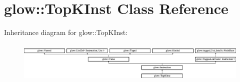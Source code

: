 \hypertarget{classglow_1_1_top_k_inst}{}\section{glow\+:\+:Top\+K\+Inst Class Reference}
\label{classglow_1_1_top_k_inst}
Inheritance diagram for glow\+:\+:Top\+K\+Inst\+:\begin{figure}[H]
\begin{center}
\leavevmode
\includegraphics[height=1.991111cm]{classglow_1_1_top_k_inst}
\end{center}
\end{figure}
